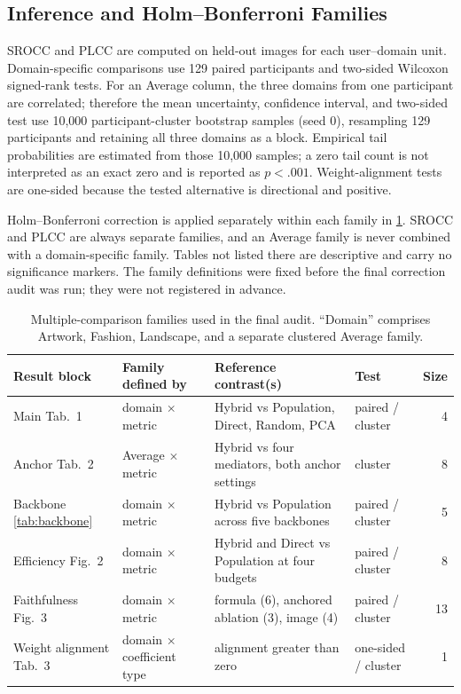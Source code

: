 \documentclass[10pt,twocolumn,letterpaper]{article}
\begin{document}
\subsection{Inference and Holm--Bonferroni Families}

SROCC and PLCC are computed on held-out images for each user--domain unit.
Domain-specific comparisons use 129 paired participants and two-sided
Wilcoxon signed-rank tests. For an Average column, the three domains from one
participant are correlated; therefore the mean uncertainty, confidence
interval, and two-sided test use 10,000 participant-cluster bootstrap samples
(seed 0), resampling 129 participants and retaining all three domains as a
block. Empirical tail probabilities are estimated from those 10,000 samples;
a zero tail count is not interpreted as an exact zero and is reported as
$p<.001$. Weight-alignment tests are one-sided because the tested alternative
is directional and positive.

Holm--Bonferroni correction is applied separately within each family in
\cref{tab:holm_families}. SROCC and PLCC are always separate families, and an
Average family is never combined with a domain-specific family. Tables not
listed there are descriptive and carry no significance markers.
The family definitions were fixed before the final correction audit was run;
they were not registered in advance.

\begin{table}[t]
\centering
\caption{Multiple-comparison families used in the final audit. ``Domain'' comprises
Artwork, Fashion, Landscape, and a separate clustered Average family.}
\label{tab:holm_families}
\setlength{\tabcolsep}{5pt}
\begin{tabular}{p{2.2cm}p{2.6cm}p{6.3cm}p{2.3cm}r}
\toprule
Result block & Family defined by & Reference contrast(s) & Test & Size \\
\midrule
Main Tab.~1 & domain $\times$ metric & Hybrid vs Population, Direct, Random, PCA & paired / cluster & 4 \\
Anchor Tab.~2 & Average $\times$ metric & Hybrid vs four mediators, both anchor settings & cluster & 8 \\
Backbone \cref{tab:backbone} & domain $\times$ metric & Hybrid vs Population across five backbones & paired / cluster & 5 \\
Efficiency Fig.~2 & domain $\times$ metric & Hybrid and Direct vs Population at four budgets & paired / cluster & 8 \\
Faithfulness Fig.~3 & domain $\times$ metric & formula (6), anchored ablation (3), image (4) & paired / cluster & 13 \\
Weight alignment Tab.~3 & domain $\times$ coefficient type & alignment greater than zero & one-sided / cluster & 1 \\
\bottomrule
\end{tabular}
\end{table}
\end{document}
